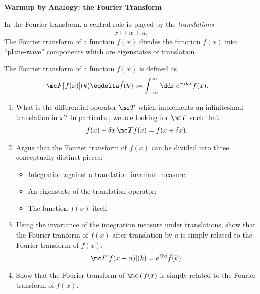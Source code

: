 




\begin{exercise}
    \textbf{Warmup by Analogy: the Fourier Transform}

    In the Fourier transform, a central role is played by the \emph{translations}
    \begin{align}
        x \mapsto x + a
        .
    \end{align}
    The Fourier transform of a function \(f(x)\) divides the function \(f(x)\) into ``plane-wave'' components which are eigenstates of translation.

    The Fourier transform of a function \(f(x)\) is defined as
    \begin{align}
        \mc F[f(x)](k)
        \eqdelta
        \tilde f(k)
        &:=
        \int_{-\infty}^{\infty} \dd x \, e^{-ikx} f(x)
        .
    \end{align}

    \begin{enumerate}[label=\roman*)]
        \item
            What is the differential operator \(\mc T\) which implements an infinitesimal translation in \(x\)?
            In particular, we are looking for \(\mc T\) such that:
            \begin{align}
                f(x) + \delta x \, \mc T f(x) = f(x+\delta x)
                .
            \end{align}

        \item
            Argue that the Fourier transform of \(f(x)\) can be divided into three conceptually distinct pieces:
            \begin{itemize}
                \item
                    Integration against a translation-invariant measure;

                \item
                    An eigenstate of the translation operator;

                \item
                    The function \(f(x)\) itself.
            \end{itemize}

        \item
            Using the invariance of the integration measure under translations, show that the Fourier tranform of \(f(x)\) after translation by \(a\) is simply related to the Fourier transform of \(f(x)\):
            \begin{align}
                \mc F[f(x+a)](k) = e^{ika} \tilde f(k)
                .
            \end{align}

        \item
            Show that the Fourier transform of \(\mc T f(x)\) is simply related to the Fourier transform of \(f(x)\).
    \end{enumerate}
\end{exercise}

